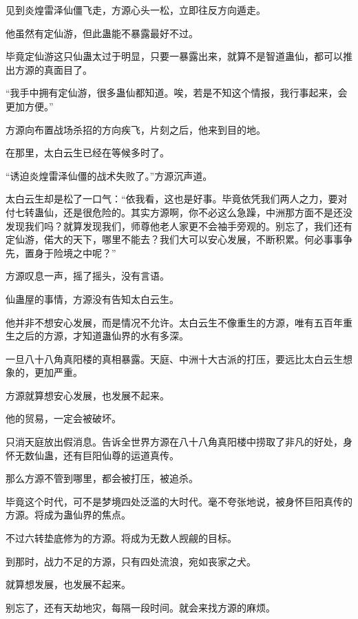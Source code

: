 
\begin{this_body}

见到炎煌雷泽仙僵飞走，方源心头一松，立即往反方向遁走。

他虽然有定仙游，但此蛊能不暴露最好不过。

毕竟定仙游这只仙蛊太过于明显，只要一暴露出来，就算不是智道蛊仙，都可以推出方源的真面目了。

“我手中拥有定仙游，很多蛊仙都知道。唉，若是不知这个情报，我行事起来，会更加方便。”

方源向布置战场杀招的方向疾飞，片刻之后，他来到目的地。

在那里，太白云生已经在等候多时了。

“诱迫炎煌雷泽仙僵的战术失败了。”方源沉声道。

太白云生却是松了一口气：“依我看，这也是好事。毕竟依凭我们两人之力，要对付七转蛊仙，还是很危险的。其实方源啊，你不必这么急躁，中洲那方面不是还没发现我们吗？就算发现我们，师尊他老人家更不会袖手旁观的。别忘了，我们还有定仙游，偌大的天下，哪里不能去？我们大可以安心发展，不断积累。何必事事争先，置身于险境之中呢？”

方源叹息一声，摇了摇头，没有言语。

仙蛊屋的事情，方源没有告知太白云生。

他并非不想安心发展，而是情况不允许。太白云生不像重生的方源，唯有五百年重生之后的方源，才知道蛊仙界的水有多深。

一旦八十八角真阳楼的真相暴露。天庭、中洲十大古派的打压，要远比太白云生想象的，更加严重。

方源就算想安心发展，也发展不起来。

他的贸易，一定会被破坏。

只消天庭放出假消息。告诉全世界方源在八十八角真阳楼中捞取了非凡的好处，身怀无数仙蛊，还有巨阳仙尊的运道真传。

那么方源不管到哪里，都会被打压，被追杀。

毕竟这个时代，可不是梦境四处泛滥的大时代。毫不夸张地说，被身怀巨阳真传的方源。将成为蛊仙界的焦点。

不过六转垫底修为的方源。将成为无数人觊觎的目标。

到那时，战力不足的方源，只有四处流浪，宛如丧家之犬。

就算想发展，也发展不起来。

别忘了，还有天劫地灾，每隔一段时间。就会来找方源的麻烦。


\end{this_body}
